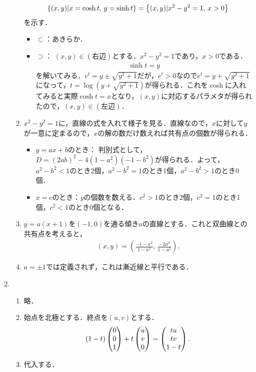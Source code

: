 \documentclass[9pt]{ltjsarticle}
\begin{document}
\begin{enumerate}[label=(問題\arabic*)]
\begin{enumerate}[label=(\alph*)]
\begin{align}
 \left\{(x,y)| x=\cosh t,\, y=\sinh t\right\} = \left\{(x,y) | x^2-y^2=1,\, x>0\right\}
\end{align}
を示す．
\begin{itemize}
 \item $\subset$：あきらか．
 \item $\supset$：
$(x,y)\in (右辺)$とする．$x^2-y^2=1$であり，$x>0$である．
\begin{align}
 \sinh t = y
\end{align}
を解いてみる．$e^t=y\pm \sqrt{y^2+1}$だが，$e^t>0$なので$e^t=y+\sqrt{y^2+1}$になって，$t=\log(y+\sqrt{y^2+1})$が得られる．これを$\cosh$に入れてみると実際$\cosh t = x$となり，$(x,y)$に対応するパラメタが得られたので，$(x,y)\in (左辺)$．
\end{itemize}
 \item $x^2-y^2=1$に，直線の式を入れて様子を見る．直線なので，$x$に対して$y$が一意に定まるので，$x$の解の数だけ数えれば共有点の個数が得られる．
\begin{itemize}
 \item $y=ax+b$のとき：
判別式として，$D=(2ab)^2-4(1-a^2)(-1-b^2)$が得られる．よって，
$a^2-b^2 < 1$のとき2個，$a^2-b^2=1$のとき1個，$a^2-b^2 > 1$のとき0個．
 \item $x=c$のとき：$y$の個数を数える．$c^2>1$のとき2個，$c^2=1$のとき1個，$c^2<1$のとき0個となる．
\end{itemize}
 \item $y=a(x+1)$を$(-1,0)$を通る傾き$a$の直線とする．これと双曲線との共有点を考えると，
\begin{align}
 (x,y) = (\frac{-1-a^2}{1-a^2},\, \frac{-2a^3}{1-a^2}).
\end{align}
 \item $a=\pm 1$では定義されず，これは漸近線と平行である．
\end{enumerate}
 \item
\begin{enumerate}[label=(\alph*)]
 \item 略．
 \item 始点を北極とする．終点を$(u,v)$とする．
\begin{align}
 (1-t)\left(\begin{matrix} 0 \\ 0 \\ 1 \end{matrix}\right) + t \left(\begin{matrix} u \\ v \\ 0 \end{matrix}\right) = \left(\begin{matrix} tu \\ tv \\ 1-t \end{matrix}\right).
\end{align}
 \item 代入する．

\end{enumerate}
\end{enumerate}
\end{document}
